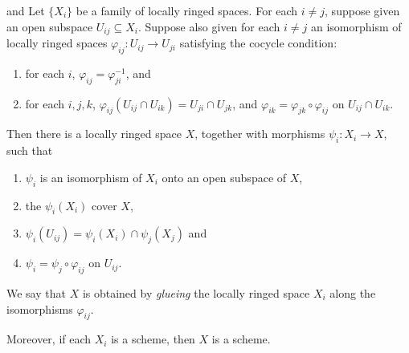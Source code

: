 \documentclass[11pt]{article}
\begin{document}
\begin{proposition}
  \cite[Exercise II.2.12]{hartsAG} and \cite[Lemma 26.14.1]{stacks} 
  Let $ \{X_{i}\} $ be a family of locally ringed spaces. For each $ i \neq j $, 
  suppose given an open subspace $ U_{ij} \subseteq X_{i} $. 
  Suppose also given for each $ i \neq j $ an isomorphism of locally ringed spaces 
  $ \varphi_{ij} : U_{ij} \to U_{ji} $ satisfying the cocycle condition: 
  \begin{enumerate}[label=(\arabic*)]
    \item for each $ i $, $ \varphi_{ij} = \varphi_{ji}^{-1} $, and
    \item for each $ i,j,k $, $ \varphi_{ij}(U_{ij} \cap U_{ik}) = U_{ji} \cap U_{jk} $, 
    and $ \varphi_{ik} = \varphi_{jk} \circ \varphi_{ij} $ on $ U_{ij} \cap U_{ik} $. 
  \end{enumerate}
  Then there is a locally ringed space $ X $, together with morphisms 
  $ \psi_{i} : X_{i} \to X $, such that 
  \begin{enumerate}[label=(\arabic*)]
    \item $ \psi_{i} $ is an isomorphism of $ X_{i} $ onto an open subspace of $ X $, 
    \item the $ \psi_{i}(X_{i}) $ cover $ X $, 
    \item $ \psi_{i}(U_{ij}) = \psi_{i}(X_{i}) \cap \psi_{j}(X_{j}) $ and 
    \item $ \psi_{i} = \psi_{j} \circ \varphi_{ij} $ on $ U_{ij} $. 
  \end{enumerate}
  We say that $ X $ is obtained by \emph{glueing} the locally ringed space $ X_{i} $ 
  along the isomorphisms $ \varphi_{ij} $. 

  Moreover, if each $ X_{i} $ is a scheme, then $ X $ is a scheme. 
\end{proposition}

\printbibliography
\end{document}
